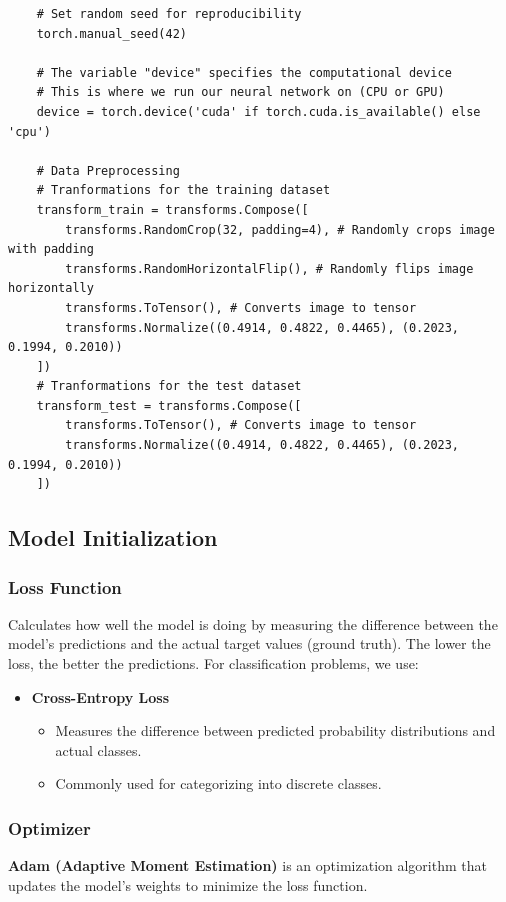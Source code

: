 \begin{lstlisting}
    # Set random seed for reproducibility
    torch.manual_seed(42)

    # The variable "device" specifies the computational device 
    # This is where we run our neural network on (CPU or GPU)
    device = torch.device('cuda' if torch.cuda.is_available() else 'cpu')

    # Data Preprocessing 
    # Tranformations for the training dataset
    transform_train = transforms.Compose([
        transforms.RandomCrop(32, padding=4), # Randomly crops image with padding
        transforms.RandomHorizontalFlip(), # Randomly flips image horizontally
        transforms.ToTensor(), # Converts image to tensor
        transforms.Normalize((0.4914, 0.4822, 0.4465), (0.2023, 0.1994, 0.2010))
    ])
    # Tranformations for the test dataset
    transform_test = transforms.Compose([
        transforms.ToTensor(), # Converts image to tensor
        transforms.Normalize((0.4914, 0.4822, 0.4465), (0.2023, 0.1994, 0.2010))
    ])
\end{lstlisting}


\subsection{Model Initialization}
\subsubsection{Loss Function}
Calculates how well the model is doing by measuring the difference between the model's predictions and the actual target values (ground truth). The lower the loss, the better the predictions. For classification problems, we use:
\begin{itemize}
    \item \textbf{Cross-Entropy Loss}
    \begin{itemize}
        \item Measures the difference between predicted probability distributions and actual classes.
        \item Commonly used for categorizing into discrete classes.
    \end{itemize}
\end{itemize}

\subsubsection{Optimizer}
\textbf{Adam (Adaptive Moment Estimation)} is an optimization algorithm that updates the model's 
weights to minimize the loss function.


